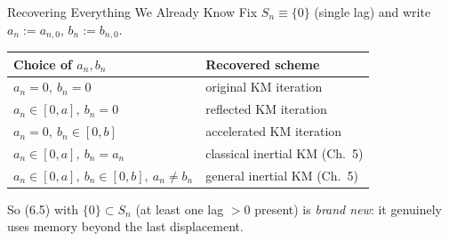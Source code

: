 \documentclass[aspectratio=169,10pt]{beamer}
\begin{document}
\begin{frame}{Recovering Everything We Already Know}
Fix $S_n\equiv\{0\}$ (single lag) and write $a_n:=a_{n,0}$, $b_n:=b_{n,0}$.
\begin{table}
\centering\small
\begin{tabular}{@{}ll@{}}
\toprule
Choice of $a_n,b_n$ & Recovered scheme \\
\midrule
$a_n=0,\ b_n=0$ & original KM iteration \\
$a_n\in[0,a],\ b_n=0$ & reflected KM iteration \\
$a_n=0,\ b_n\in[0,b]$ & accelerated KM iteration \\
$a_n\in[0,a],\ b_n=a_n$ & classical inertial KM (Ch.\ 5) \\
$a_n\in[0,a],\ b_n\in[0,b],\ a_n\ne b_n$ & general inertial KM (Ch.\ 5) \\
\bottomrule
\end{tabular}
\end{table}
\vspace{1em}
So (6.5) with $\{0\}\subset S_n$ (at least one lag $>0$ present) is
\emph{brand new}: it genuinely uses memory beyond the last displacement.
\end{frame}
\end{document}
